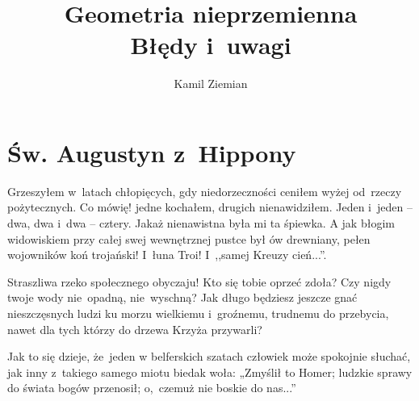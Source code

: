 \documentclass[a4paper,11pt]{article}
\title{Geometria nieprzemienna \\
  Błędy i~uwagi}
\author{Kamil Ziemian}
\begin{document}





\maketitle %





\section{Św. Augustyn z~Hippony}



\noindent
Grzeszyłem w~latach chłopięcych, gdy niedorzeczności ceniłem
wyżej od~rzeczy pożytecznych. Co mówię! jedne kochałem, drugich
nienawidziłem. Jeden i~jeden -- dwa, dwa i~dwa -- cztery. Jakaż
nienawistna była mi ta śpiewka. A jak błogim widowiskiem przy całej
swej wewnętrznej pustce był ów drewniany, pełen wojowników koń
trojański! I~łuna Troi! I~,,samej Kreuzy cień...''.


\vspace{\spaceThree}



\noindent
Straszliwa rzeko społecznego obyczaju! Kto się tobie oprzeć
zdoła? Czy nigdy twoje wody nie~opadną, nie~wyschną? Jak długo
będziesz jeszcze gnać nieszczęsnych ludzi ku morzu wielkiemu
i~groźnemu, trudnemu do przebycia, nawet dla tych którzy do drzewa
Krzyża przywarli?


\vspace{\spaceThree}




\noindent
Jak to się dzieje, że~jeden w belferskich szatach człowiek może
spokojnie słuchać, jak inny z~takiego samego miotu biedak woła:
„Zmyślił to Homer; ludzkie sprawy do świata bogów przenosił;
o,~czemuż nie boskie do nas...”
\end{document}
